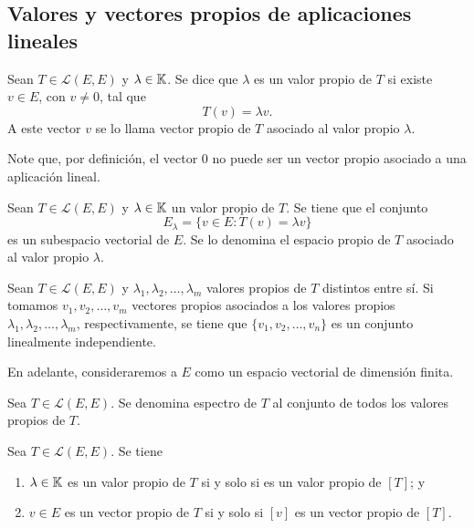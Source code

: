 \documentclass[a4,11pt]{aleph-notas}
\begin{document}
\subsection{Valores y vectores propios de aplicaciones lineales}

\begin{defi}
     Sean $T \in \mathcal{L}(E,E)$ y $\lambda \in\mathbb{K}$. Se dice que $\lambda$ es un valor propio de $T$ si existe $v\in E$, con $v\neq 0$, tal que
     \[
        T(v) = \lambda v.
     \]
     A este vector $v$ se lo llama vector propio de $T$ asociado al valor propio $\lambda$.
\end{defi}

\begin{advertencia}
    Note que, por definición, el vector $0$ no puede ser un vector propio asociado a una aplicación lineal.
\end{advertencia}

\begin{teo}
    Sean $T \in \mathcal{L}(E,E)$ y $\lambda \in\mathbb{K}$ un valor propio de $T$. Se tiene que el conjunto
    \[
        E_\lambda = \{ v\in E : T(v) = \lambda v\} 
    \]
    es un subespacio vectorial de $E$. Se lo denomina el espacio propio de $T$ asociado al valor propio $\lambda$.
\end{teo}


\begin{teo}
    Sean $T \in \mathcal{L}(E,E)$ y $\lambda_1, \lambda_2, \ldots, \lambda_m$ valores propios de $T$ distintos entre sí. Si tomamos $v_1, v_2, \ldots, v_m$ vectores propios asociados a los valores propios $\lambda_1, \lambda_2, \ldots, \lambda_m$, respectivamente, se tiene que $\{v_1, v_2, \ldots, v_n\}$ es un conjunto linealmente independiente. 
\end{teo}


En adelante, consideraremos a $E$ como un espacio vectorial de dimensión finita.

\begin{defi}
     Sea $T \in \mathcal{L}(E,E)$. Se denomina espectro de $T$ al conjunto de todos los valores propios de $T$.
\end{defi}


\begin{teo}
    Sea $T \in \mathcal{L}(E,E)$. Se tiene 
    \begin{enumerate}
    \item
        $\lambda\in\mathbb{K}$ es un valor propio de $T$ si y solo si es un valor propio de $[T]$; y
    \item
        $v\in E$ es un vector propio de $T$ si y solo si $[v]$ es un vector propio de $[T]$.
    \end{enumerate}
\end{teo}
\end{document}
